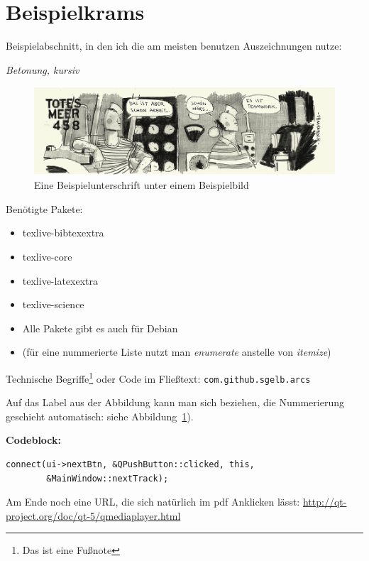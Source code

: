 \section{Beispielkrams}
Beispielabschnitt, in den ich die am meisten benutzen Auszeichnungen nutze:

\emph{Betonung, kursiv}

\begin{figure}[ht!]
    \centering
    \includegraphics[width=\textwidth]{pics/test.png}
    \caption{Eine Beispielunterschrift unter einem Beispielbild}
    \label{fig:test}
\end{figure}

Benötigte Pakete:
\begin{itemize}

  \item texlive-bibtexextra
  \item texlive-core
  \item texlive-latexextra
  \item texlive-science
  \item Alle Pakete gibt es auch für Debian
  \item (für eine nummerierte Liste nutzt man \emph{enumerate} anstelle von
    \emph{itemize})

\end{itemize}

Technische Begriffe\footnote{Das ist eine Fußnote} oder Code im Fließtext:
\texttt{com.github.sgelb.arcs}

Auf das Label aus der Abbildung kann man sich beziehen, die Nummerierung
geschieht automatisch: siehe Abbildung~\ref{fig:test}).


\textbf{Codeblock:}

\begin{lstlisting}
connect(ui->nextBtn, &QPushButton::clicked, this,
        &MainWindow::nextTrack);
\end{lstlisting}

Am Ende noch eine URL, die sich natürlich im pdf Anklicken lässt:
\url{http://qt-project.org/doc/qt-5/qmediaplayer.html}

